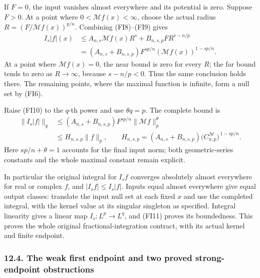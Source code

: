 \documentclass[
  11pt,
]{article}
\makeatletter
\let\ReaderOriginalAnchorStart\hyper@anchorstart
\let\ReaderOriginalAnchorEnd\hyper@anchorend
\let\ReaderPendingAliases\@empty
\def\ReaderArmAliases#1{\gdef\ReaderPendingAliases{#1}}
\def\hyper@anchorstart#1{\ReaderIfNativeAnchorTF{#1}{\ReaderPendingAliases\global\let\ReaderPendingAliases\@empty}{}\ReaderOriginalAnchorStart{#1}}
\makeatother
\begin{document}
If \(F=0\), the input vanishes almost everywhere and its potential is
zero. Suppose \(F>0\). At a point where \(0<\mathcal Mf(x)<\infty\),
choose the actual radius \(R=(F/\mathcal Mf(x))^{p/n}\). Combining
(FI8)--(FI9) gives \[
 \begin{split}
 I_s|f|(x)
 &\leq A_{n,s}\mathcal Mf(x)R^s
           +B_{n,s,p}F R^{s-n/p}\\
 &=(A_{n,s}+B_{n,s,p})
                F^{sp/n}(\mathcal Mf(x))^{1-sp/n}.
 \end{split}                                                   \tag{FI10}
\] At a point where \(\mathcal Mf(x)=0\), the near bound is zero for
every \(R\); the far bound tends to zero as \(R\to\infty\), because
\(s-n/p<0\). Thus the same conclusion holds there. The remaining points,
where the maximal function is infinite, form a null set by (FI6).

Raise (FI10) to the \(q\)-th power and use \(\theta q=p\). The complete
bound is \[
 \begin{split}
 \|I_s|f|\|_q
 &\leq(A_{n,s}+B_{n,s,p})
                 F^{sp/n}\|\mathcal Mf\|_p^\theta\\
 &\leq H_{n,s,p}\|f\|_p,\qquad
 H_{n,s,p}=(A_{n,s}+B_{n,s,p})\bigl(C^{\mathcal M}_{n,p}\bigr)^{\,1-sp/n}.
 \end{split}                                                   \tag{FI11}
\] Here \(sp/n+\theta=1\) accounts for the final input norm; both
geometric-series constants and the whole maximal constant remain
explicit.

In particular the original integral for \(I_sf\) converges absolutely
almost everywhere for real or complex \(f\), and \(|I_sf|\leq I_s|f|\).
Inputs equal almost everywhere give equal output classes: translate the
input null set at each fixed \(x\) and use the completed integral, with
the kernel value at its singular singleton as specified. Integral
linearity gives a linear map \(I_s:L^p\to L^q\), and (FI11) proves its
boundedness. This proves the whole original fractional-integration
contract, with its actual kernel and finite endpoint.

\ReaderArmAliases{\ReaderOriginalAnchorStart{AN03-LCE-FRAC-004}\ReaderOriginalAnchorEnd\begingroup\expandafter\def\csname @currentHref\endcsname{AN03-LCE-FRAC-004}\label{AN03-LCE-FRAC-004}\endgroup\ReaderOriginalAnchorStart{the-weak-first-endpoint-and-two-proved-strong-endpoint-obstructions}\ReaderOriginalAnchorEnd}
\subsubsection{12.4. The weak first endpoint and two proved
strong-endpoint
obstructions}\label{the-weak-first-endpoint-and-two-proved-strong-endpoint-obstructions}
\end{document}
